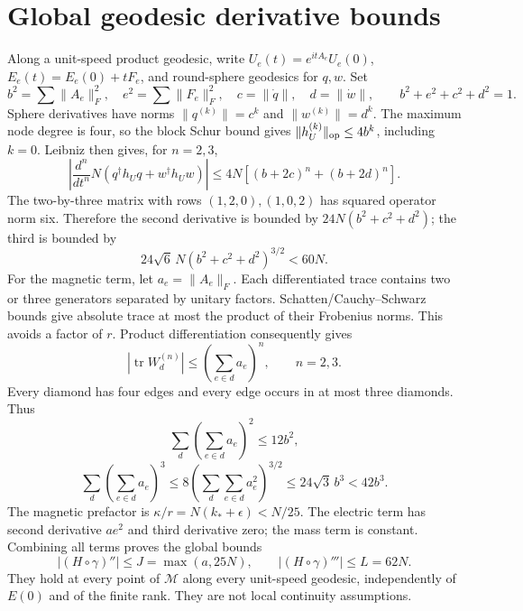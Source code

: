 \documentclass[11pt,a4paper]{article}
\newcommand{\tr}{\operatorname{tr}}\newcommand{\diag}{\operatorname{diag}}\newcommand{\Rea}{\operatorname{Re}}\newcommand{\id}{\mathbf1}
\begin{document}
\section{Global geodesic derivative bounds}
Along a unit-speed product geodesic, write $U_e(t)=e^{itA_e}U_e(0)$, $E_e(t)=E_e(0)+tF_e$, and round-sphere geodesics for $q,w$. Set
\[
b^2=\sum\|A_e\|_F^2,\quad e^2=\sum\|F_e\|_F^2,
\quad c=\|\dot q\|,\quad d=\|\dot w\|,\qquad b^2+e^2+c^2+d^2=1.
\]
Sphere derivatives have norms $\|q^{(k)}\|=c^k$ and $\|w^{(k)}\|=d^k$. The maximum node degree is four, so the block Schur bound gives $\|h_U^{(k)}\|_{\rm op}\le4b^k$, including $k=0$. Leibniz then gives, for $n=2,3$,
\[
\left|\frac{d^n}{dt^n}N(q^\dagger h_Uq+w^\dagger h_Uw)\right|
\le4N[(b+2c)^n+(b+2d)^n].
\]
The two-by-three matrix with rows $(1,2,0),(1,0,2)$ has squared operator norm six. Therefore the second derivative is bounded by $24N(b^2+c^2+d^2)$; the third is bounded by
\[
24\sqrt6\,N(b^2+c^2+d^2)^{3/2}<60N.
\]
For the magnetic term, let $a_e=\|A_e\|_F$. Each differentiated trace contains two or three generators separated by unitary factors. Schatten/Cauchy--Schwarz bounds give absolute trace at most the product of their Frobenius norms. This avoids a factor of $r$. Product differentiation consequently gives
\[
|\tr W_d^{(n)}|\le\left(\sum_{e\in d}a_e\right)^n,\qquad n=2,3.
\]
Every diamond has four edges and every edge occurs in at most three diamonds. Thus
\[
\sum_d\left(\sum_{e\in d}a_e\right)^2\le12b^2,
\]
\[
\sum_d\left(\sum_{e\in d}a_e\right)^3
\le8\left(\sum_d\sum_{e\in d}a_e^2\right)^{3/2}
\le24\sqrt3\,b^3<42b^3.
\]
The magnetic prefactor is $\kappa/r=N(k_*+\epsilon)<N/25$. The electric term has second derivative $ae^2$ and third derivative zero; the mass term is constant. Combining all terms proves the global bounds
\begin{equation}\label{eq:derivatives}
\boxed{|(H\circ\gamma)''|\le J=\max(a,25N),\qquad
|(H\circ\gamma)'''|\le L=62N.}
\end{equation}
They hold at every point of $\mathcal M$ along every unit-speed geodesic, independently of $E(0)$ and of the finite rank. They are not local continuity assumptions.
\newpage
\end{document}
